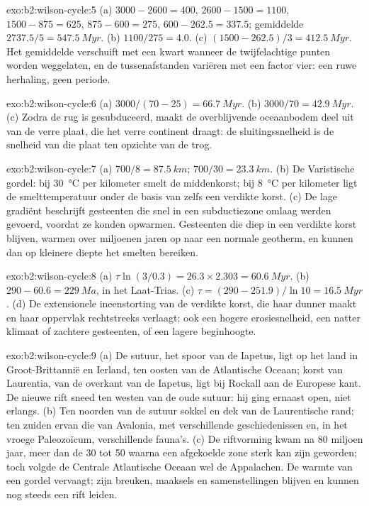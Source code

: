 \begin{solution}{exo:b2:wilson-cycle:5}
(a) $3000 - 2600 = 400$, $2600 - 1500 = 1100$, $1500 - 875 = 625$, $875 - 600 = 275$, $600 -
262.5 = 337.5$; gemiddelde $2737.5/5 = \qty{547.5}{Myr}$. (b) $1100/275 = 4.0$. (c) $(1500 -
262.5)/3 = \qty{412.5}{Myr}$. Het gemiddelde verschuift met een kwart wanneer de twijfelachtige punten worden weggelaten,
en de tussenafstanden variëren met een factor vier: een ruwe herhaling, geen periode.
\end{solution}

\begin{solution}{exo:b2:wilson-cycle:6}
(a) $3000/(70 - 25) = \qty{66.7}{Myr}$. (b) $3000/70 = \qty{42.9}{Myr}$. (c) Zodra de rug is
gesubduceerd, maakt de overblijvende oceaanbodem deel uit van de verre plaat, die het verre
continent draagt: de sluitingssnelheid is de snelheid van die plaat ten opzichte van de trog.
\end{solution}

\begin{solution}{exo:b2:wilson-cycle:7}
(a) $700/8 = \qty{87.5}{km}$; $700/30 = \qty{23.3}{km}$. (b) De Varistische gordel: bij
\qty{30}{\celsius} per kilometer smelt de middenkorst; bij \qty{8}{\celsius} per kilometer
ligt de smelttemperatuur onder de basis van zelfs een verdikte korst. (c) De lage gradiënt
beschrijft gesteenten die snel in een subductiezone omlaag werden gevoerd, voordat ze konden opwarmen. Gesteenten die
diep in een verdikte korst blijven, warmen over miljoenen jaren op naar een normale geotherm, en kunnen
dan op kleinere diepte het smelten bereiken.
\end{solution}

\begin{solution}{exo:b2:wilson-cycle:8}
(a) $\tau\ln(3/0.3) = 26.3\times2.303 = \qty{60.6}{Myr}$. (b) $290 - 60.6 = \qty{229}{Ma}$, in
het Laat-Trias. (c) $\tau = (290 - 251.9)/\ln10 = \qty{16.5}{Myr}$. (d) De extensionele
ineenstorting van de verdikte korst, die haar dunner maakt en haar oppervlak rechtstreeks verlaagt; ook een
hogere erosiesnelheid, een natter klimaat of zachtere gesteenten, of een lagere beginhoogte.
\end{solution}

\begin{solution}{exo:b2:wilson-cycle:9}
(a) De sutuur, het spoor van de Iapetus, ligt op het land in Groot-Brittannië en Ierland, ten oosten van de
Atlantische Oceaan; korst van Laurentia, van de overkant van de Iapetus, ligt bij Rockall aan de
Europese kant. De nieuwe rift sneed ten westen van de oude sutuur: hij ging ernaast open, niet erlangs.
(b) Ten noorden van de sutuur sokkel en dek van de Laurentische rand; ten zuiden ervan die van
Avalonia, met verschillende geschiedenissen en, in het vroege Paleozoïcum, verschillende fauna's. (c) De riftvorming
kwam na 80 miljoen jaar, meer dan de 30 tot 50 waarna een afgekoelde zone sterk kan zijn
geworden; toch volgde de Centrale Atlantische Oceaan wel de Appalachen. De warmte van een gordel vervaagt; zijn
breuken, maaksels en samenstellingen blijven en kunnen nog steeds een rift leiden.
\end{solution}

